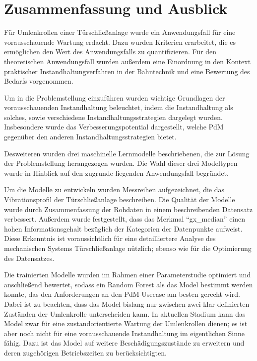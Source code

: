 \chapter{Zusammenfassung und Ausblick}
\label{ch:fazit}
Für Umlenkrollen einer Türschließanlage wurde ein Anwendungsfall für eine vorausschauende Wartung erdacht. Dazu wurden Kriterien erarbeitet, die es ermöglichen den Wert des Anwendungsfalls zu quantifizieren. Für den theoretischen Anwendungsfall wurden außerdem eine Einordnung in den Kontext praktischer Instandhaltungverfahren in der Bahntechnik und eine Bewertung des Bedarfs vorgenommen.

Um in die Problemstellung einzuführen wurden wichtige Grundlagen der vorausschauenden Instandhaltung beleuchtet, indem die Instandhaltung als solches, sowie verschiedene Instandhaltungsstrategien dargelegt wurden. Insbesondere wurde das Verbesserungspotential dargestellt, welche PdM gegenüber den anderen Instandhaltungsstrategien bietet.

Desweiteren wurden drei maschinelle Lernmodelle beschriebenen, die zur Lösung der Problemstellung herangezogen wurden. Die Wahl dieser drei Modeltypen wurde in Hinblick auf den zugrunde liegenden Anwendungsfall begründet. 

Um die Modelle zu entwickeln wurden Messreihen aufgezeichnet, die das Vibrationsprofil der Türschließanlage beschreiben. Die Qualität der Modelle wurde durch Zusammenfassung der Rohdaten in einem beschreibenden Datensatz verbessert. Außerdem wurde festgestellt, dass das Merkmal \enquote{gx\_median} einen hohen Informationsgehalt bezüglich der Kategorien der Datenpunkte aufweist. Diese Erkenntnis ist voraussichtlich für eine detailliertere Analyse des mechanischen Systems Türschließanlage nützlich; ebenso wie für die Optimierung des Datensatzes.

Die trainierten Modelle wurden im Rahmen einer Parameterstudie optimiert und anschließend bewertet, sodass ein Random Forest als das Model bestimmt werden konnte, das den Anforderungen an den PdM-Usecase am besten gerecht wird. Dabei ist zu beachten, dass das Model bislang nur zwischen zwei klar definierten Zuständen der Umlenkrolle unterscheiden kann. In aktuellen Stadium kann das Model zwar für eine zustandorientierte Wartung der Umlenkrollen dienen; es ist aber noch nicht für eine vorausschauende Instandhaltung im eigentlichen Sinne fähig. Dazu ist das Model auf weitere Beschädigungszustände zu erweitern und deren zugehörigen Betriebszeiten zu berücksichtigten.
